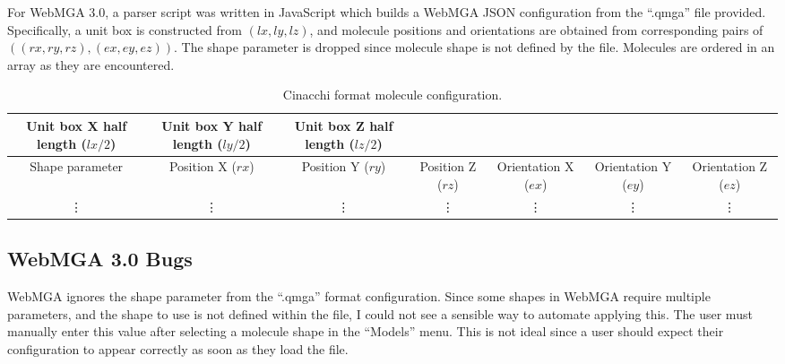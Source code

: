For WebMGA 3.0, a parser script was written in JavaScript which builds a WebMGA JSON configuration from the ``.qmga'' file provided. Specifically, a unit box is constructed from $(lx, ly, lz)$, and molecule positions and orientations are obtained from corresponding pairs of $((rx,ry,rz),(ex,ey,ez))$. The shape parameter is dropped since molecule shape is not defined by the file. Molecules are ordered in an array as they are encountered.
\begin{table}
  \begin{center}
  \begin{adjustbox}{width=\textwidth}
    \begin{tabular}{|c|c|c|c|c|c|c|}
      \hline
       Unit box X half length ($lx/2$) & Unit box Y half length ($ly/2$) & Unit box Z half length ($lz/2$) & & & &\\
       \hline
       Shape parameter & Position X ($rx$) & Position Y ($ry$) & Position Z ($rz$) & Orientation X ($ex$) & Orientation Y ($ey$) & Orientation Z ($ez$)\\
       \hline
       \vdots & \vdots & \vdots & \vdots & \vdots & \vdots & \vdots \\
       \hline
    \end{tabular}
  \end{adjustbox}
  \end{center}
  \caption{Cinacchi format molecule configuration.}
  \label{tab:cinacchi_format}
\end{table}

\subsection{WebMGA 3.0 Bugs}
WebMGA ignores the shape parameter from the ``.qmga'' format configuration. Since some shapes in WebMGA require multiple parameters, and the shape to use is not defined within the file, I could not see a sensible way to automate applying this. The user must manually enter this value after selecting a molecule shape in the ``Models'' menu. This is not ideal since a user should expect their configuration to appear correctly as soon as they load the file.
